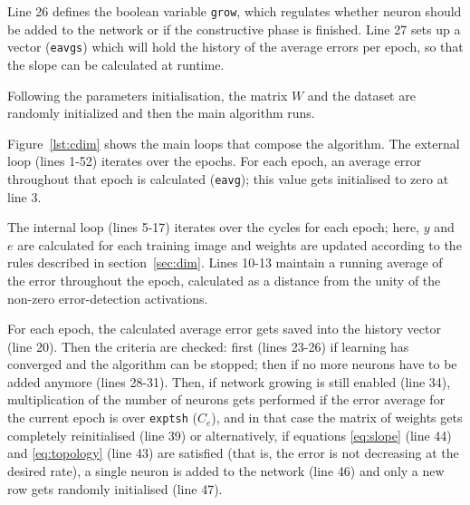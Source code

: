 \documentclass[11pt,a4paper]{report}
\begin{document}
				Line 26 defines the boolean variable \texttt{grow}, which regulates whether neuron should be added to the network or if the constructive phase is finished. Line 27 sets up a vector (\texttt{eavgs}) which will hold the history of the average errors per epoch, so that the slope can be calculated at runtime.

				Following the parameters initialisation, the matrix $W$ and the dataset are randomly initialized and then the main algorithm runs.
				
				Figure~\ref{lst:cdim} shows the main loops that compose the algorithm. The external loop (lines 1-52) iterates over the epochs. For each epoch, an average error throughout that epoch is calculated (\texttt{eavg}); this value gets initialised to zero at line 3.
				
				The internal loop (lines 5-17) iterates over the cycles for each epoch; here, $y$ and $e$ are calculated for each training image and weights are updated according to the rules described in section~\ref{sec:dim}. Lines 10-13 maintain a running average of the error throughout the epoch, calculated as a distance from the unity of the non-zero error-detection activations.
				
				For each epoch, the calculated average error gets saved into the history vector (line 20). Then the criteria are checked: first (lines 23-26) if learning has converged and the algorithm can be stopped; then if no more neurons have to be added anymore (lines 28-31). Then, if network growing is still enabled (line 34), multiplication of the number of neurons gets performed if the error average for the current epoch is over \texttt{exptsh} ($C_e$), and in that case the matrix of weights gets completely reinitialised (line 39) or alternatively, if equations \ref{eq:slope} (line 44) and \ref{eq:topology} (line 43) are satisfied (that is, the error is not decreasing at the desired rate), a single neuron is added to the network (line 46) and only a new row gets randomly initialised (line 47).
				
\end{document}
